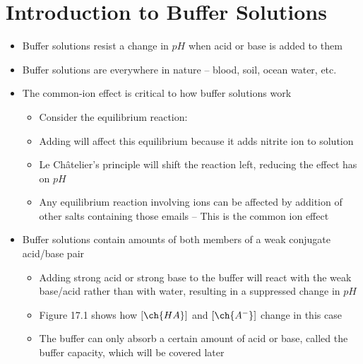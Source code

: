 \documentclass[12pt, openany, letterpaper]{memoir}
\begin{document}
\section{Introduction to Buffer Solutions}
\begin{itemize}
	\item Buffer solutions resist a change in $pH$ when acid or base is added to them
	\item Buffer solutions are everywhere in nature -- blood, soil, ocean water, etc.
	\item The common-ion effect is critical to how buffer solutions work
	\begin{itemize}
		\item Consider the equilibrium reaction: 
		\item Adding  will affect this equilibrium because it adds nitrite ion to solution
		\item Le Ch\^atelier's principle will shift the reaction left, reducing the effect  has on $pH$
		\item Any equilibrium reaction involving ions can be affected by addition of other salts containing those emails -- This is the common ion effect
	\end{itemize}
	\item Buffer solutions contain amounts of both members of a weak conjugate acid/base pair
	\begin{itemize}
		\item Adding strong acid or strong base to the buffer will react with the weak base/acid rather than with water, resulting in a suppressed change in $pH$
		\item Figure 17.1 shows how $\left[\ch{HA}\right]$ and $\left[\ch{A^-}\right]$ change in this case
		\item The buffer can only absorb a certain amount of acid or base, called the buffer capacity, which will be covered later
	\end{itemize}
\end{itemize}
\end{document}
